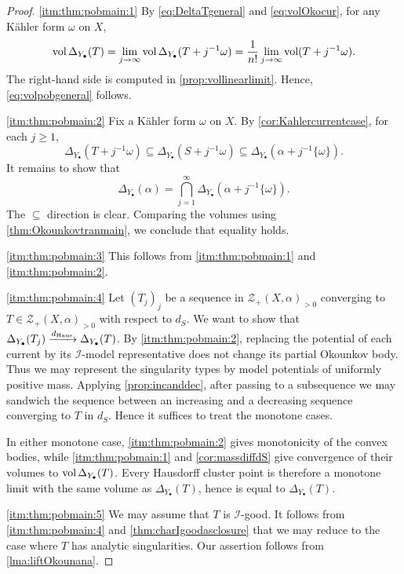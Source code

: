 \begin{proof}
\ref{itm:thm:pobmain:1} By \eqref{eq:DeltaTgeneral} and \eqref{eq:volOkocur}, for any Kähler form $\omega$ on $X$,
\[
\operatorname{vol} \Delta_{Y_{\bullet}}(T)=\lim_{j\to\infty}\operatorname{vol} \Delta_{Y_{\bullet}}(T+j^{-1}\omega)=\frac{1}{n!}\lim_{j\to\infty}\operatorname{vol}(T+j^{-1}\omega).
\]
The right-hand side is computed in \cref{prop:vollinearlimit}. Hence, \eqref{eq:volpobgeneral} follows.

\ref{itm:thm:pobmain:2} Fix a Kähler form $\omega$ on $X$. By \cref{cor:Kahlercurrentcase}, for each $j\geq 1$,
\[
\Delta_{Y_{\bullet}}(T+j^{-1}\omega)\subseteq \Delta_{Y_{\bullet}}(S+j^{-1}\omega)\subseteq \Delta_{Y_{\bullet}}(\alpha+j^{-1}\{\omega\}).
\]
It remains to show that
\[
\Delta_{Y_{\bullet}}(\alpha)=\bigcap_{j=1}^{\infty}\Delta_{Y_{\bullet}}(\alpha+j^{-1}\{\omega\}).
\]
The $\subseteq$ direction is clear. Comparing the volumes using \cref{thm:Okounkovtranmain}, we conclude that equality holds.

\ref{itm:thm:pobmain:3} This follows from \ref{itm:thm:pobmain:1} and \ref{itm:thm:pobmain:2}.

\ref{itm:thm:pobmain:4} Let $(T_j)_j$ be a sequence in $\mathcal{Z}_+(X,\alpha)_{>0}$ converging to $T\in \mathcal{Z}_+(X,\alpha)_{>0}$ with respect to $d_S$. We want to show that $\Delta_{Y_{\bullet}}(T_j)\xrightarrow{d_{\mathrm{Haus}}} \Delta_{Y_{\bullet}}(T)$. By \ref{itm:thm:pobmain:2}, replacing the potential of each current by its $\mathcal I$-model representative does not change its partial Okounkov body. Thus we may represent the singularity types by model potentials of uniformly positive mass. Applying \cref{prop:incanddec}, after passing to a subsequence we may sandwich the sequence between an increasing and a decreasing sequence converging to $T$ in $d_S$. Hence it suffices to treat the monotone cases.

In either monotone case, \ref{itm:thm:pobmain:2} gives monotonicity of the convex bodies, while \ref{itm:thm:pobmain:1} and \cref{cor:massdiffdS} give convergence of their volumes to $\operatorname{vol}\Delta_{Y_{\bullet}}(T)$. Every Hausdorff cluster point is therefore a monotone limit with the same volume as $\Delta_{Y_{\bullet}}(T)$, hence is equal to $\Delta_{Y_{\bullet}}(T)$.

\ref{itm:thm:pobmain:5} We may assume that $T$ is $\mathcal{I}$-good. It follows from \ref{itm:thm:pobmain:4} and \cref{thm:charIgoodasclosure} that we may reduce to the case where $T$ has analytic singularities. Our assertion follows from \cref{lma:liftOkounana}.


\end{proof}

